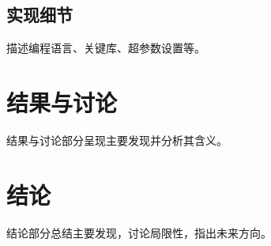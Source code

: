 \documentclass[12pt, a4paper]{ctexart}
\begin{document}
\subsection{实现细节}

描述编程语言、关键库、超参数设置等。

\section{结果与讨论}

结果与讨论部分呈现主要发现并分析其含义。

\section{结论}

结论部分总结主要发现，讨论局限性，指出未来方向。

% 
% 
\end{document}
